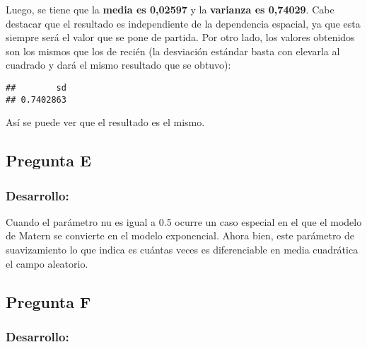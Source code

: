 \documentclass[
]{article}
\newenvironment{Shaded}{\begin{snugshade}}{\end{snugshade}}
\newcommand{\DecValTok}[1]{\textcolor[rgb]{0.00,0.00,0.81}{#1}}
\newcommand{\NormalTok}[1]{#1}
\newcommand{\SpecialCharTok}[1]{\textcolor[rgb]{0.00,0.00,0.00}{#1}}
\begin{document}
Luego, se tiene que la \textbf{media es 0,02597} y la \textbf{varianza
es 0,74029}. Cabe destacar que el resultado es independiente de la
dependencia espacial, ya que esta siempre será el valor que se pone de
partida. Por otro lado, los valores obtenidos son los mismos que los de
recién (la desviación estándar basta con elevarla al cuadrado y dará el
mismo resultado que se obtuvo):

\begin{Shaded}
\end{Shaded}

\begin{verbatim}
##        sd 
## 0.7402863
\end{verbatim}

Así se puede ver que el resultado es el mismo.

\hypertarget{pregunta-e}{%
\subsection{Pregunta E}\label{pregunta-e}}

\hypertarget{desarrollo-4}{%
\subsubsection{Desarrollo:}\label{desarrollo-4}}

Cuando el parámetro nu es igual a 0.5 ocurre un caso especial en el que
el modelo de Matern se convierte en el modelo exponencial. Ahora bien,
este parámetro de suavizamiento lo que indica es cuántas veces es
diferenciable en media cuadrática el campo aleatorio.

\hypertarget{pregunta-f}{%
\subsection{Pregunta F}\label{pregunta-f}}

\hypertarget{desarrollo-5}{%
\subsubsection{Desarrollo:}\label{desarrollo-5}}
\end{document}
